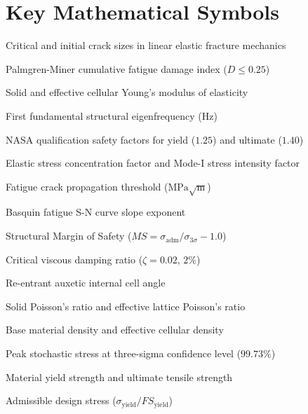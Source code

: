\section*{Key Mathematical Symbols}
\begin{description}
\item[$a_c, a_{\text{init}}$] Critical and initial crack sizes in linear elastic fracture mechanics
\item[$D$] Palmgren-Miner cumulative fatigue damage index ($D \le 0.25$)
\item[$E, E^*$] Solid and effective cellular Young's modulus of elasticity
\item[$f_1$] First fundamental structural eigenfrequency ($\text{Hz}$)
\item[$FS_{\text{yield}}, FS_{\text{ult}}$] NASA qualification safety factors for yield ($1.25$) and ultimate ($1.40$)
\item[$K_t, K_I$] Elastic stress concentration factor and Mode-I stress intensity factor
\item[$\Delta K_{\text{th}}$] Fatigue crack propagation threshold ($\text{MPa}\sqrt{\text{m}}$)
\item[$m$] Basquin fatigue S-N curve slope exponent
\item[$MS$] Structural Margin of Safety ($MS = \sigma_{\text{adm}}/\sigma_{3\sigma} - 1.0$)
\item[$\zeta$] Critical viscous damping ratio ($\zeta = 0.02$, $2\%$)
\item[$\theta$] Re-entrant auxetic internal cell angle
\item[$\nu, \nu_{\text{eff}}$] Solid Poisson's ratio and effective lattice Poisson's ratio
\item[$\rho_s, \rho^*$] Base material density and effective cellular density
\item[$\sigma_{3\sigma}$] Peak stochastic stress at three-sigma confidence level ($99.73\%$)
\item[$\sigma_{\text{yield}}, \sigma_{\text{ult}}$] Material yield strength and ultimate tensile strength
\item[$\sigma_{\text{adm}}$] Admissible design stress ($\sigma_{\text{yield}} / FS_{\text{yield}}$)
\end{description}
